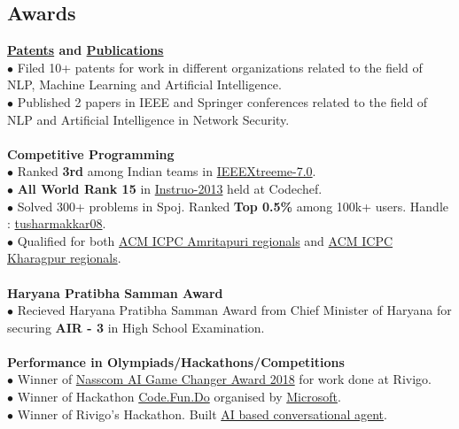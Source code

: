 \documentclass[margin,line]{resume}
\begin{document}
\begin{resume}
  \section{\mysidestyle \bf Awards}
  {\bf \href{https://patents.google.com/?inventor=Tushar+Makkar}{Patents} and \href{https://scholar.google.nl/citations?user=sSG1P_QAAAAJ}{Publications}}
\\$\bullet$ Filed 10+ patents for work in different organizations related to the field of NLP, Machine Learning and Artificial Intelligence.
    \\$\bullet$ Published 2 papers in IEEE and Springer conferences related to the field of NLP and Artificial Intelligence in Network Security.
    \pagebreak
  \\\\{\bf Competitive Programming }
 \\$\bullet$ Ranked {\bfseries 3rd} among Indian teams in \href{http://www.ieee.org/membership_services/membership/students/competitions/xtreme/index.html}{IEEEXtreeme-7.0}.
    \\$\bullet$ {\bfseries All World Rank 15} in \href{http://www.codechef.com/rankings/INST2013/}{Instruo-2013} held at Codechef.
\\$\bullet$ Solved 300+ problems in Spoj. Ranked {\bfseries Top 0.5\%} among 100k+ users. Handle :  \href{http://www.spoj.com/users/tusharmakkar08/}{tusharmakkar08}.
    \\$\bullet$ Qualified for both \href{icpc.amrita.ac.in}{ACM ICPC Amritapuri regionals} and \href{http://acm.iitkgp.ac.in/}{ACM ICPC Kharagpur regionals}.
\\\\    {\bf Haryana Pratibha Samman Award}
     \\$\bullet$ Recieved Haryana Pratibha Samman Award from Chief Minister of Haryana for securing {\bfseries AIR - 3} in High School Examination.
\\\\ {\bf Performance in Olympiads/Hackathons/Competitions}
    \\$\bullet$ Winner of \href{https://www.linkedin.com/feed/update/urn:li:activity:6425565017244037120/}{Nasscom AI Game Changer Award 2018} for work done at Rivigo.
     \\$\bullet$ Winner of Hackathon \href{https://www.acadaccelerator.com/Home/Events}{Code.Fun.Do} organised by \href{http://www.microsoft.com/en-in/msidc/default.aspx}{Microsoft}.
        \\$\bullet$ Winner of Rivigo's Hackathon. Built \href{https://eng.rivigo.com/technology/artificial-intelligence-based-conversational-agents/}{AI based conversational agent}.

\end{resume}
\end{document}
